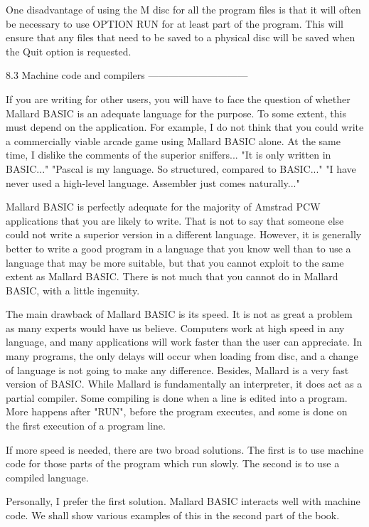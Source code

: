One disadvantage of using the M disc for all the program files is that it will 
often  be necessary to use OPTION RUN for at least part of the  program.  This 
will  ensure that any files that need to be saved to a physical disc  will  be 
saved when the Quit option is requested.


8.3 Machine code and compilers
------------------------------

If  you  are writing for other users, you will have to face  the  question  of 
whether Mallard BASIC is an adequate language for the purpose. To some extent, 
this  must  depend on the application. For example, I do not  think  that  you 
could  write a commercially viable arcade game using Mallard BASIC  alone.  At 
the same time, I dislike the comments of the superior sniffers... "It is  only 
written  in  BASIC..."  "Pascal is my language.  So  structured,  compared  to 
BASIC..."  "I  have  never used a high-level language.  Assembler  just  comes 
naturally..."

Mallard  BASIC  is  perfectly  adequate  for  the  majority  of  Amstrad   PCW 
applications  that  you are likely to write. That is not to say  that  someone 
else  could not write a superior version in a different language. However,  it 
is  generally better to write a good program in a language that you know  well 
than to use a language that may be more suitable, but that you cannot  exploit 
to  the same extent as Mallard BASIC. There is not much that you cannot do  in 
Mallard BASIC, with a little ingenuity.

The main drawback of Mallard BASIC is its speed. It is not as great a  problem 
as  many  experts would have us believe. Computers work at high speed  in  any 
language, and many applications will work faster than the user can appreciate. 
In  many  programs, the only delays will occur when loading from disc,  and  a 
change of language is not going to make any difference. Besides, Mallard is  a 
very fast version of BASIC. While Mallard is fundamentally an interpreter,  it 
does  act as a partial compiler. Some compiling is done when a line is  edited 
into  a  program. More happens after "RUN", before the program  executes,  and 
some is done on the first execution of a program line.

If  more speed is needed, there are two broad solutions. The first is  to  use 
machine code for those parts of the program which run slowly. The second is to 
use a compiled language.

Personally,  I  prefer the first solution. Mallard BASIC interacts  well  with 
machine code. We shall show various examples of this in the second part of the 
book.

